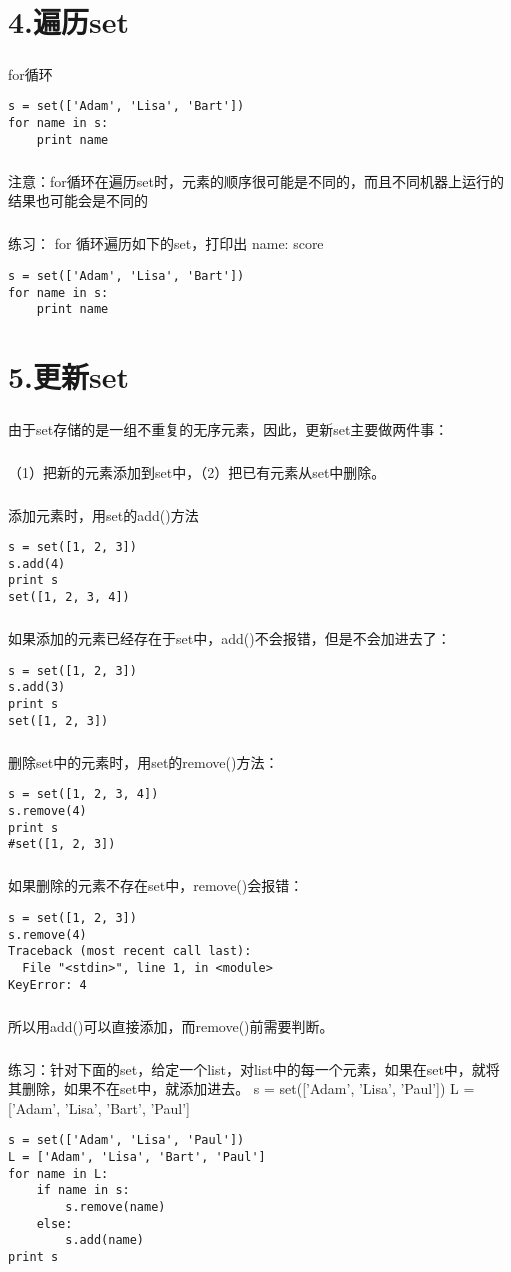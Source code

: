 \documentclass{article}
\begin{document}
\begin{CJK}{UTF8}{gbsn}
\section*{4.遍历set}
\subparagraph*{}
for循环
\begin{verbatim}
s = set(['Adam', 'Lisa', 'Bart'])
for name in s:
    print name
\end{verbatim}
\subparagraph*{}
注意：for循环在遍历set时，元素的顺序很可能是不同的，而且不同机器上运行的结果也可能会是不同的
\subparagraph*{}
练习： for 循环遍历如下的set，打印出 name: score
\begin{verbatim}
s = set(['Adam', 'Lisa', 'Bart'])
for name in s:
    print name
\end{verbatim}
\section*{5.更新set}
\subparagraph*{}
由于set存储的是一组不重复的无序元素，因此，更新set主要做两件事：
\subparagraph*{}
（1）把新的元素添加到set中，（2）把已有元素从set中删除。
\subparagraph*{}
添加元素时，用set的add()方法
\begin{verbatim}
s = set([1, 2, 3])
s.add(4)
print s
set([1, 2, 3, 4])
\end{verbatim}
\subparagraph*{}
如果添加的元素已经存在于set中，add()不会报错，但是不会加进去了：
\begin{verbatim}
s = set([1, 2, 3])
s.add(3)
print s
set([1, 2, 3])
\end{verbatim}
\subparagraph*{}
删除set中的元素时，用set的remove()方法：
\begin{verbatim}
s = set([1, 2, 3, 4])
s.remove(4)
print s
#set([1, 2, 3])
\end{verbatim}
\subparagraph*{}
如果删除的元素不存在set中，remove()会报错：
\begin{verbatim}
s = set([1, 2, 3])
s.remove(4)
Traceback (most recent call last):
  File "<stdin>", line 1, in <module>
KeyError: 4
\end{verbatim}
\subparagraph*{}
所以用add()可以直接添加，而remove()前需要判断。
\subparagraph*{}
练习：针对下面的set，给定一个list，对list中的每一个元素，如果在set中，就将其删除，如果不在set中，就添加进去。
s = set(['Adam', 'Lisa', 'Paul'])
L = ['Adam', 'Lisa', 'Bart', 'Paul']
\begin{verbatim}
s = set(['Adam', 'Lisa', 'Paul'])
L = ['Adam', 'Lisa', 'Bart', 'Paul']
for name in L:
    if name in s:
        s.remove(name)
    else:
        s.add(name)
print s
\end{verbatim}
\end{CJK}
\end{document}
